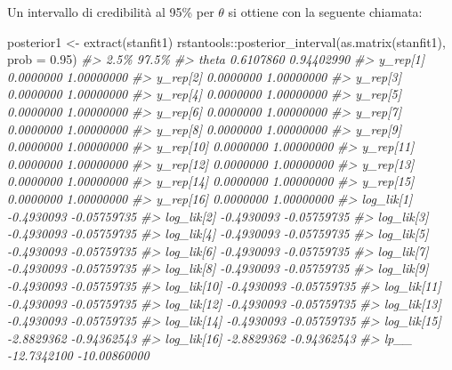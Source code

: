 \documentclass[
  11pt,
  italian,
  a4paper,
  extrafontsizes,onecolumn,openright
  ]{memoir}
\newenvironment{Shaded}{\begin{snugshade}}{\end{snugshade}}
\newcommand{\AttributeTok}[1]{\textcolor[rgb]{0.77,0.63,0.00}{#1}}
\newcommand{\CommentTok}[1]{\textcolor[rgb]{0.56,0.35,0.01}{\textit{#1}}}
\newcommand{\FloatTok}[1]{\textcolor[rgb]{0.00,0.00,0.81}{#1}}
\newcommand{\FunctionTok}[1]{\textcolor[rgb]{0.00,0.00,0.00}{#1}}
\newcommand{\NormalTok}[1]{#1}
\newcommand{\OtherTok}[1]{\textcolor[rgb]{0.56,0.35,0.01}{#1}}
\newcommand{\SpecialCharTok}[1]{\textcolor[rgb]{0.00,0.00,0.00}{#1}}
\begin{document}
Un intervallo di credibilità al 95\% per \(\theta\) si ottiene con la seguente chiamata:

\begin{Shaded}
\begin{Highlighting}[]
\NormalTok{posterior1 }\OtherTok{\textless{}{-}} \FunctionTok{extract}\NormalTok{(stanfit1)}
\NormalTok{rstantools}\SpecialCharTok{::}\FunctionTok{posterior\_interval}\NormalTok{(}\FunctionTok{as.matrix}\NormalTok{(stanfit1), }\AttributeTok{prob =} \FloatTok{0.95}\NormalTok{)}
\CommentTok{\#\textgreater{}                    2.5\%        97.5\%}
\CommentTok{\#\textgreater{} theta         0.6107860   0.94402990}
\CommentTok{\#\textgreater{} y\_rep[1]      0.0000000   1.00000000}
\CommentTok{\#\textgreater{} y\_rep[2]      0.0000000   1.00000000}
\CommentTok{\#\textgreater{} y\_rep[3]      0.0000000   1.00000000}
\CommentTok{\#\textgreater{} y\_rep[4]      0.0000000   1.00000000}
\CommentTok{\#\textgreater{} y\_rep[5]      0.0000000   1.00000000}
\CommentTok{\#\textgreater{} y\_rep[6]      0.0000000   1.00000000}
\CommentTok{\#\textgreater{} y\_rep[7]      0.0000000   1.00000000}
\CommentTok{\#\textgreater{} y\_rep[8]      0.0000000   1.00000000}
\CommentTok{\#\textgreater{} y\_rep[9]      0.0000000   1.00000000}
\CommentTok{\#\textgreater{} y\_rep[10]     0.0000000   1.00000000}
\CommentTok{\#\textgreater{} y\_rep[11]     0.0000000   1.00000000}
\CommentTok{\#\textgreater{} y\_rep[12]     0.0000000   1.00000000}
\CommentTok{\#\textgreater{} y\_rep[13]     0.0000000   1.00000000}
\CommentTok{\#\textgreater{} y\_rep[14]     0.0000000   1.00000000}
\CommentTok{\#\textgreater{} y\_rep[15]     0.0000000   1.00000000}
\CommentTok{\#\textgreater{} y\_rep[16]     0.0000000   1.00000000}
\CommentTok{\#\textgreater{} log\_lik[1]   {-}0.4930093  {-}0.05759735}
\CommentTok{\#\textgreater{} log\_lik[2]   {-}0.4930093  {-}0.05759735}
\CommentTok{\#\textgreater{} log\_lik[3]   {-}0.4930093  {-}0.05759735}
\CommentTok{\#\textgreater{} log\_lik[4]   {-}0.4930093  {-}0.05759735}
\CommentTok{\#\textgreater{} log\_lik[5]   {-}0.4930093  {-}0.05759735}
\CommentTok{\#\textgreater{} log\_lik[6]   {-}0.4930093  {-}0.05759735}
\CommentTok{\#\textgreater{} log\_lik[7]   {-}0.4930093  {-}0.05759735}
\CommentTok{\#\textgreater{} log\_lik[8]   {-}0.4930093  {-}0.05759735}
\CommentTok{\#\textgreater{} log\_lik[9]   {-}0.4930093  {-}0.05759735}
\CommentTok{\#\textgreater{} log\_lik[10]  {-}0.4930093  {-}0.05759735}
\CommentTok{\#\textgreater{} log\_lik[11]  {-}0.4930093  {-}0.05759735}
\CommentTok{\#\textgreater{} log\_lik[12]  {-}0.4930093  {-}0.05759735}
\CommentTok{\#\textgreater{} log\_lik[13]  {-}0.4930093  {-}0.05759735}
\CommentTok{\#\textgreater{} log\_lik[14]  {-}0.4930093  {-}0.05759735}
\CommentTok{\#\textgreater{} log\_lik[15]  {-}2.8829362  {-}0.94362543}
\CommentTok{\#\textgreater{} log\_lik[16]  {-}2.8829362  {-}0.94362543}
\CommentTok{\#\textgreater{} lp\_\_        {-}12.7342100 {-}10.00860000}
\end{Highlighting}
\end{Shaded}
\end{document}
